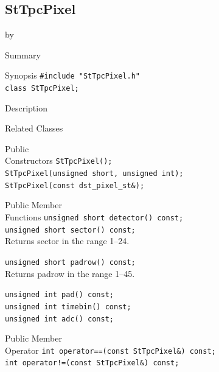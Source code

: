 \documentclass[twoside]{article}
\newcommand{\entrylabel}[1]{\mbox{\textbf{{#1}}}\hfil}%
\newenvironment{entry}
{\begin{list}{}%
    {\renewcommand{\makelabel}{\entrylabel}%
     \setlength{\labelwidth}{90pt}%
     \setlength{\leftmargin}{\labelwidth}
     \advance\leftmargin by \labelsep%
      }%
    }%
  {\end{list}}
\newcommand{\Entrylabel}[1]%
{\raisebox{0pt}[1ex][0pt]{\makebox[\labelwidth][l]%
    {\parbox[t]{\labelwidth}{\hspace{0pt}\textbf{{#1}}}}}}
\newenvironment{Entry}%
{\renewcommand{\entrylabel}{\Entrylabel}\begin{entry}}%
  {\end{entry}}
\begin{document}
\subsection{StTpcPixel}
\label{sec:StTpcPixel}
\begin{Entry}
\item[Summary] 
\item[Synopsis]
    \verb+#include "StTpcPixel.h"+\\
    \verb+class StTpcPixel;+\\
\item[Description]
\item[Related Classes]
\item[Public\\ Constructors]
    \verb+StTpcPixel();+\\
    \verb+StTpcPixel(unsigned short, unsigned int);+\\
    \verb+StTpcPixel(const dst_pixel_st&);+\\
\item[Public Member\\ Functions]
    \verb+unsigned short detector() const;+\\
    
    \verb+unsigned short sector() const;+\\
    Returns sector in the range 1--24.

    \verb+unsigned short padrow() const;+\\
    Returns padrow in the range 1--45.

    \verb+unsigned int pad() const;+\\
    \verb+unsigned int timebin() const;+\\
    \verb+unsigned int adc() const;+\\
\item[Public Member\\ Operator]
    \verb+int operator==(const StTpcPixel&) const;+\\
    \verb+int operator!=(const StTpcPixel&) const;+\\
\end{Entry}
\clearpage
\end{document}
